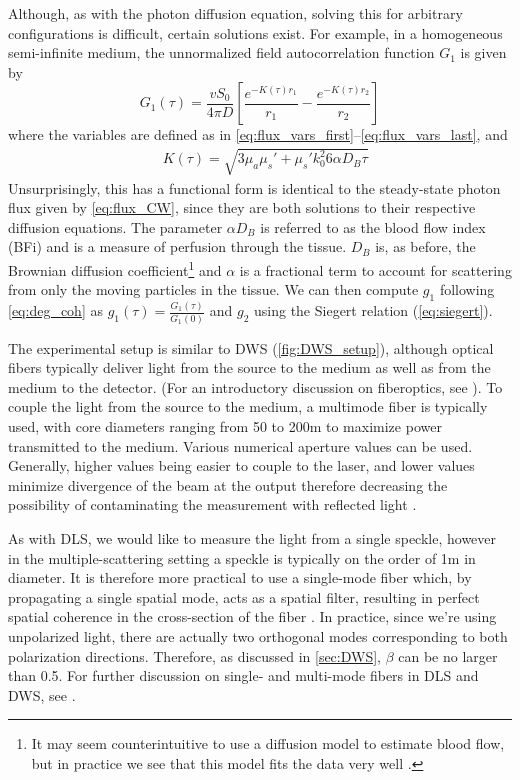 Although, as with the photon diffusion equation, solving this for arbitrary configurations is difficult, certain solutions exist. For example, in a homogeneous semi-infinite medium, the unnormalized field autocorrelation function $G_1$ is given by \cite{Durduran2010}
\begin{equation}\label{eq:g1_DCS_seminf}
G_1(\tau) = \frac{vS_0}{4\pi D}
\left[
    \frac{ e^{-K(\tau)r_1} }{ r_1 }
    -\frac{ e^{-K(\tau)r_2} }{ r_2 }
\right]
\end{equation}
where the variables are defined as in \autoref{eq:flux_vars_first}--\ref{eq:flux_vars_last}, and 
\begin{align}
&K(\tau) = \sqrt{3 \mu_a \mu_s' + \mu_s' k_0^2 6 \alpha D_B \tau}
\end{align}
Unsurprisingly, this has a functional form is identical to the steady-state photon flux given by \autoref{eq:flux_CW}, since they are both solutions to their respective diffusion equations. The parameter $\alpha D_B$ is referred to as the blood flow index (BFi) and is a measure of perfusion through the tissue. $D_B$ is, as before, the Brownian diffusion coefficient\footnote{It may seem counterintuitive to use a diffusion model to estimate blood flow, but in practice we see that this model fits the data very well \cite{Durduran2010}.} and $\alpha$ is a fractional term to account for scattering from only the moving particles in the tissue. We can then compute $g_1$ following \autoref{eq:deg_coh} as $g_1(\tau) = \frac{G_1(\tau)}{G_1(0)}$ and $g_2$ using the Siegert relation (\autoref{eq:siegert}).  

The experimental setup is similar to DWS (\autoref{fig:DWS_setup}), although optical fibers typically deliver light from the source to the medium as well as from the medium to the detector. (For an introductory discussion on fiberoptics, see \cite[ch. 5.6]{Hecht2002}). To couple the light from the source to the medium, a multimode fiber is typically used, with core diameters ranging from 50 to 200\textmu m to maximize power transmitted to the medium. Various numerical aperture values can be used. Generally, higher values being easier to couple to the laser, and lower values minimize divergence of the beam at the output therefore decreasing the possibility of contaminating the measurement with reflected light \cite[ch. 6.2]{Boas1996thesis}.

As with DLS, we would like to measure the light from a single speckle, however in the multiple-scattering setting a speckle is typically on the order of 1\textmu m in diameter. It is therefore more practical to use a single-mode fiber which, by propagating a single spatial mode, acts as a spatial filter, resulting in perfect spatial coherence in the cross-section of the fiber \cite{Ricka1993}. In practice, since we're using unpolarized light, there are actually two orthogonal modes corresponding to both polarization directions. Therefore, as discussed in \autoref{sec:DWS}, $\beta$ can be no larger than 0.5. For further discussion on single- and multi-mode fibers in DLS and DWS, see \cite{VanKeuren1993, Ricka1993}.

